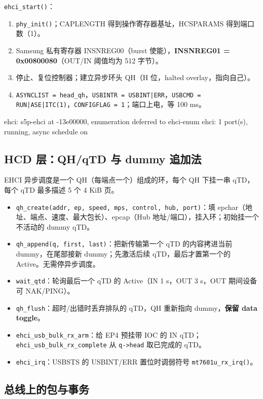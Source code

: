 \documentclass[UTF8,zihao=-4,fontset=none]{ctexart}
\newcommand{\fn}[1]{\texttt{#1}}
\begin{document}
\fn{ehci\_start()}：
\begin{enumerate}[leftmargin=2em,itemsep=0pt]
\item \fn{phy\_init()}；CAPLENGTH 得到操作寄存器基址，HCSPARAMS 得到端口数（1）。
\item Samsung 私有寄存器 INSNREG00（burst 使能），\textbf{INSNREG01 = 0x00800080}（OUT/IN 阈值均为 512 字节）。
\item 停止、复位控制器；建立异步环头 QH（H 位，halted overlay，指向自己）。
\item \fn{ASYNCLIST = head\_qh}，\fn{USBINTR = USBINT|ERR}，\fn{USBCMD = RUN|ASE|ITC(1)}，\fn{CONFIGFLAG = 1}；端口上电，等 100 ms。
\end{enumerate}
\begin{logv}
ehci: s5p-ehci at -13e00000, enumeration deferred to ehci-enum
ehci: 1 port(s), running, async schedule on
\end{logv}

\subsection{HCD 层：QH/qTD 与 dummy 追加法}

EHCI 异步调度是一个 QH（每端点一个）组成的环，每个 QH 下挂一串 qTD，每个 qTD 最多描述 5 个 4 KiB 页。

\begin{itemize}[leftmargin=2em,itemsep=0pt]
\item \fn{qh\_create(addr, ep, speed, mps, control, hub, port)}：填 epchar（地址、端点、速度、最大包长）、epcap（Hub 地址/端口），挂入环；初始挂一个不活动的 dummy qTD。
\item \fn{qh\_append(q, first, last)}：把新传输第一个 qTD 的内容拷进当前 dummy，在尾部接新 dummy；先激活后续 qTD，最后才置第一个的 Active。无需停异步调度。
\item \fn{wait\_qtd}：轮询最后一个 qTD 的 Active（IN 1 s，OUT 3 s，OUT 期间设备可 NAK/PING）。
\item \fn{qh\_flush}：超时/出错时丢弃排队的 qTD，QH 重新指向 dummy，\textbf{保留 data toggle}。
\item \fn{ehci\_usb\_bulk\_rx\_arm}：给 EP4 预挂带 IOC 的 IN qTD；\fn{ehci\_usb\_bulk\_rx\_complete} 从 \fn{q->head} 取已完成的 qTD。
\item \fn{ehci\_irq}：USBSTS 的 USBINT/ERR 置位时调弱符号 \fn{mt7601u\_rx\_irq()}。
\end{itemize}

\subsection{总线上的包与事务}
\end{document}
